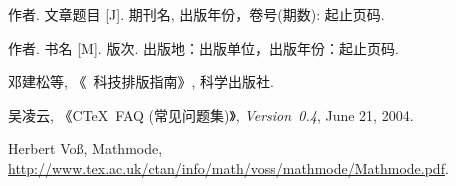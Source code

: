 \documentclass{NJUPTThesis}%
\begin{document}

\cleardoublepage{}
{}
\begin{thebibliography}{00}

   作者. 文章题目 [J].  期刊名, 出版年份，卷号(期数): 起止页码.

   作者. 书名 [M]. 版次. 出版地：出版单位，出版年份：起止页码.

   邓建松等, 《\LaTeXe~科技排版指南》, 科学出版社.

   吴凌云, 《CTeX~FAQ (常见问题集)》, \textit{Version~0.4}, June 21, 2004.

   Herbert Vo\ss, Mathmode, \url{http://www.tex.ac.uk/ctan/info/math/voss/mathmode/Mathmode.pdf}.


\end{thebibliography}


\appendix
\end{document}
